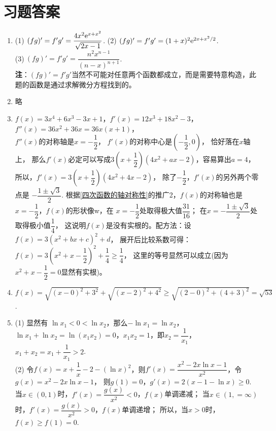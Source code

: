 \section{习题答案}
\begin{enumerate}[label={\textbf{\arabic*.}},leftmargin=
    \inteval{\myenumleftmargin}pt]
\item (1)$\ (fg)'=f'g'=\dfrac{4x^2\e^{x+x^2}}{\sqrt{2x-1}} $. \quad
(2)$\ (fg)'=f'g'=(1+x)^2\mathrm{e}^{2x+x^2/2} $. \\
(3)$\ (fg)'=f'g'=\dfrac{n^2x^{n-1}}{(n-x)^{n+1}} $. \\
\textbf{注}：$ (fg)'=f'g' $当然不可能对任意两个函数都成立，而是需要特意构造，此题的函数是通过求解微分方程找到的。

\item 略

\item $ f(x)=3x^4+6x^3-3x+1 $，$ f'(x)=12x^3+18x^2-3 $，
$ f''(x)=36x^2+36x=36x(x+1) $，\\
$ f''(x) $的对称轴是$ x=-\dfrac{1}{2} $，
$ f'(x) $的对称中心是$ \left(-\dfrac{1}{2},0\right) $，
恰好落在$ x $轴上，
那么$ f'(x) $必定可以写成$ 3\left(x+
\dfrac{1}{2}\right)(4x^2+ax-2) $，容易算出$ a=4 $，
所以，$ f'(x)=3\left(x+\dfrac{1}{2}\right)(4x^2+4x-2) $，
除了$ -\dfrac{1}{2} $，$ f'(x) $的另外两个零点是
$ -\dfrac{1\pm \sqrt{3}}{2} $. 
根据\ref{四次函数的轴对称性}的推广2，$ f(x) $的对称轴也是
$ x=-\dfrac{1}{2} $，$ f(x) $的形状像w，在
$ x=-\dfrac{1}{2} $处取得极大值$ \dfrac{31}{16} $；
在$ x=-\dfrac{1\pm \sqrt{3}}{2} $处取得极小值$ \dfrac{1}{4} $，
这说明$ f(x) $是没有实根的。配方法：设$ f(x)=3(x^2+bx+c)^2+d $，
展开后比较系数可得：$ f(x)=3\left(x^2+x-
\dfrac{1}{2}\right)^2+\dfrac{1}{4}\geq \dfrac{1}{4} $，
这里的等号显然可以成立(因为$ x^2+x-\dfrac{1}{2}=0 $显然有实根)。

\item $ f(x)=\sqrt{(x-0)^2+3^2}+\sqrt{(x-2)^2+4^2}\geq 
\sqrt{(2-0)^2+(4+3)^2} =\sqrt{53} $.

\item (1) 显然有 $ \ln x_1<0<\ln x_2 $，那么$ -\ln x_1=\ln x_2 $，
$ \ln x_1+\ln x_2=\ln(x_1x_2)=0 $，$ x_1x_2=1 $，即$ x_2=\dfrac{1}{x_1} $，
$ x_1+x_2=x_1+\dfrac{1}{x_1}>2 $. \\

(2) 令$f(x)=x+\dfrac{1}{x}-2-(\ln x)^2$，则$ f'(x)=
\dfrac{x^2-2x\ln x-1}{x^2} $，令$g(x)=x^2-2x\ln x-1$，
则$g(1)=0$，$g'(x)=2(x-1-\ln x)\geq 0$.
当$x\in(0,1)$时，$f'(x)=\dfrac{g(x)}{x^2}<0$，$f(x)$单调递减；
当$x\in(1,=\infty)$时，$f'(x)=\dfrac{g(x)}{x^2}>0$，$f(x)$单调递增；
所以，当$x>0$时，$f(x)\geq f(1)=0$.


\end{enumerate}
